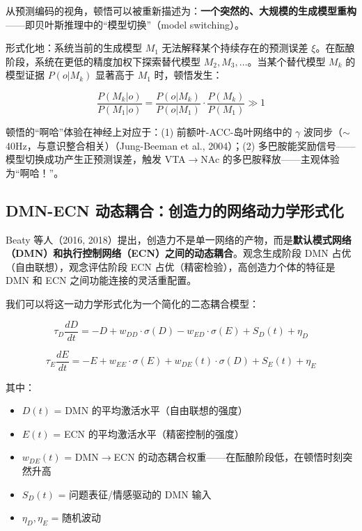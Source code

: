 \documentclass[UTF8,12pt,a4paper]{ctexart}
\begin{document}
从预测编码的视角，顿悟可以被重新描述为：\textbf{一个突然的、大规模的生成模型重构}——即贝叶斯推理中的``模型切换''（model switching）。

形式化地：系统当前的生成模型 $M_1$ 无法解释某个持续存在的预测误差 $\xi$。在酝酿阶段，系统在更低的精度加权下探索替代模型 $M_2, M_3, \ldots$。当某个替代模型 $M_k$ 的模型证据 $P(o|M_k)$ 显著高于 $M_1$ 时，顿悟发生：

\begin{equation}
\frac{P(M_k|o)}{P(M_1|o)} = \frac{P(o|M_k)}{P(o|M_1)} \cdot \frac{P(M_k)}{P(M_1)} \gg 1
\end{equation}

顿悟的``啊哈''体验在神经上对应于：(1) 前额叶-ACC-岛叶网络中的 $\gamma$ 波同步（$\sim$40Hz，与意识整合相关）（Jung-Beeman et al., 2004）；(2) 多巴胺能奖励信号——模型切换成功产生正预测误差，触发 VTA$\to$NAc 的多巴胺释放——主观体验为``啊哈！''。

\subsection{DMN-ECN 动态耦合：创造力的网络动力学形式化}

Beaty 等人（2016, 2018）提出，创造力不是单一网络的产物，而是\textbf{默认模式网络（DMN）和执行控制网络（ECN）之间的动态耦合}。观念生成阶段 DMN 占优（自由联想），观念评估阶段 ECN 占优（精密检验），高创造力个体的特征是 DMN 和 ECN 之间功能连接的灵活重配置。

我们可以将这一动力学形式化为一个简化的二态耦合模型：

\begin{equation}
\tau_D \frac{dD}{dt} = -D + w_{DD} \cdot \sigma(D) - w_{ED} \cdot \sigma(E) + S_D(t) + \eta_D
\end{equation}

\begin{equation}
\tau_E \frac{dE}{dt} = -E + w_{EE} \cdot \sigma(E) + w_{DE}(t) \cdot \sigma(D) + S_E(t) + \eta_E
\end{equation}

其中：
\begin{itemize}[nosep]
    \item $D(t)$ = DMN 的平均激活水平（自由联想的强度）
    \item $E(t)$ = ECN 的平均激活水平（精密控制的强度）
    \item $w_{DE}(t)$ = DMN$\to$ECN 的动态耦合权重——在酝酿阶段低，在顿悟时刻突然升高
    \item $S_D(t)$ = 问题表征/情感驱动的 DMN 输入
    \item $\eta_D, \eta_E$ = 随机波动
\end{itemize}
\end{document}
